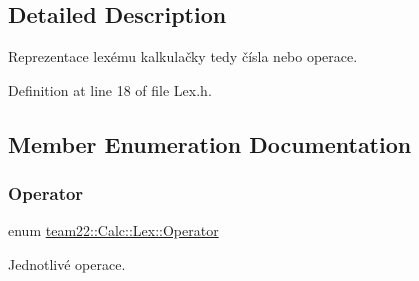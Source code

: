 \subsection{Detailed Description}
Reprezentace lexému kalkulačky tedy čísla nebo operace. 

Definition at line 18 of file Lex.\+h.



\subsection{Member Enumeration Documentation}
\mbox{\label{classteam22_1_1_calc_1_1_lex_a61d29fc4878a3b36d2de2f13c56ed932}} 
\subsubsection{\texorpdfstring{Operator}{Operator}}
{\footnotesize\ttfamily enum \hyperlink{classteam22_1_1_calc_1_1_lex_a61d29fc4878a3b36d2de2f13c56ed932}{team22\+::\+Calc\+::\+Lex\+::\+Operator}}



Jednotlivé operace. 

